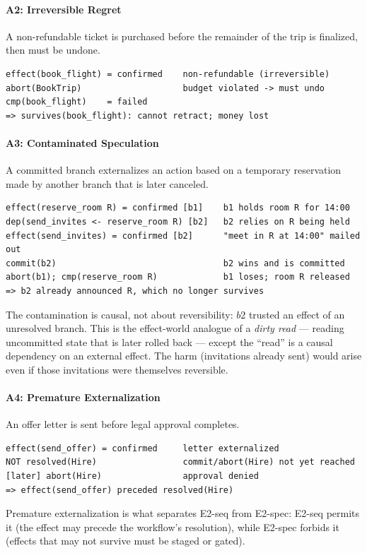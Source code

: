 \documentclass[11pt]{article}
\begin{document}
\paragraph{A2: Irreversible Regret}
A non-refundable ticket is purchased before the remainder of the trip
is finalized, then must be undone.
\begin{verbatim}
effect(book_flight) = confirmed    non-refundable (irreversible)
abort(BookTrip)                    budget violated -> must undo
cmp(book_flight)    = failed
=> survives(book_flight): cannot retract; money lost
\end{verbatim}

\paragraph{A3: Contaminated Speculation}
A committed branch externalizes an action based on a temporary
reservation made by another branch that is later canceled.
\begin{verbatim}
effect(reserve_room R) = confirmed [b1]    b1 holds room R for 14:00
dep(send_invites <- reserve_room R) [b2]   b2 relies on R being held
effect(send_invites) = confirmed [b2]      "meet in R at 14:00" mailed out
commit(b2)                                 b2 wins and is committed
abort(b1); cmp(reserve_room R)             b1 loses; room R released
=> b2 already announced R, which no longer survives
\end{verbatim}
The contamination is causal, not about reversibility: $b2$ trusted an
effect of an unresolved branch. This is the effect-world analogue of a
\emph{dirty read} --- reading uncommitted state that is later rolled
back --- except the ``read'' is a causal dependency on an external effect.
The harm (invitations already sent) would arise even if those invitations
were themselves reversible.

\paragraph{A4: Premature Externalization}
An offer letter is sent before legal approval completes.
\begin{verbatim}
effect(send_offer) = confirmed     letter externalized
NOT resolved(Hire)                 commit/abort(Hire) not yet reached
[later] abort(Hire)                approval denied
=> effect(send_offer) preceded resolved(Hire)
\end{verbatim}
Premature externalization is what separates E2-seq from E2-spec: E2-seq
permits it (the effect may precede the workflow's resolution), while
E2-spec forbids it (effects that may not survive must be staged or gated).
\end{document}
